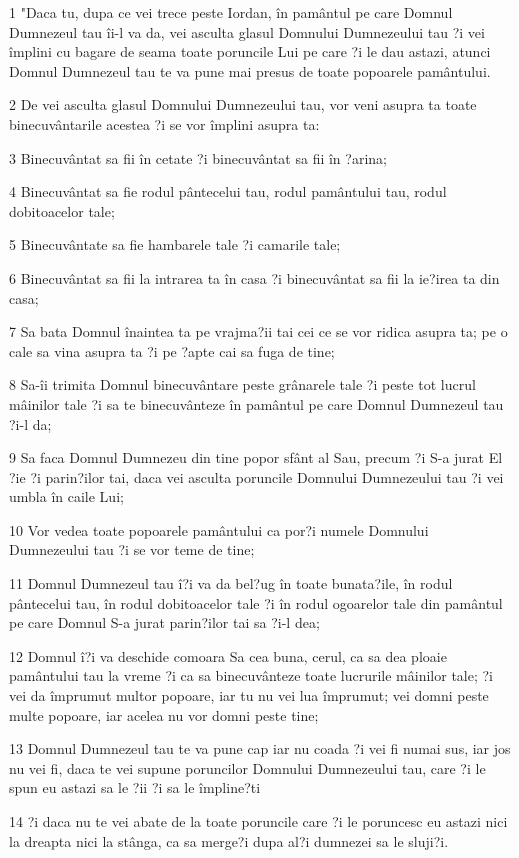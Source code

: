 \par 1 "Daca tu, dupa ce vei trece peste Iordan, în pamântul pe care Domnul Dumnezeul tau îi-l va da, vei asculta glasul Domnului Dumnezeului tau ?i vei împlini cu bagare de seama toate poruncile Lui pe care ?i le dau astazi, atunci Domnul Dumnezeul tau te va pune mai presus de toate popoarele pamântului.
\par 2 De vei asculta glasul Domnului Dumnezeului tau, vor veni asupra ta toate binecuvântarile acestea ?i se vor împlini asupra ta:
\par 3 Binecuvântat sa fii în cetate ?i binecuvântat sa fii în ?arina;
\par 4 Binecuvântat sa fie rodul pântecelui tau, rodul pamântului tau, rodul dobitoacelor tale;
\par 5 Binecuvântate sa fie hambarele tale ?i camarile tale;
\par 6 Binecuvântat sa fii la intrarea ta în casa ?i binecuvântat sa fii la ie?irea ta din casa;
\par 7 Sa bata Domnul înaintea ta pe vrajma?ii tai cei ce se vor ridica asupra ta; pe o cale sa vina asupra ta ?i pe ?apte cai sa fuga de tine;
\par 8 Sa-îi trimita Domnul binecuvântare peste grânarele tale ?i peste tot lucrul mâinilor tale ?i sa te binecuvânteze în pamântul pe care Domnul Dumnezeul tau ?i-l da;
\par 9 Sa faca Domnul Dumnezeu din tine popor sfânt al Sau, precum ?i S-a jurat El ?ie ?i parin?ilor tai, daca vei asculta poruncile Domnului Dumnezeului tau ?i vei umbla în caile Lui;
\par 10 Vor vedea toate popoarele pamântului ca por?i numele Domnului Dumnezeului tau ?i se vor teme de tine;
\par 11 Domnul Dumnezeul tau î?i va da bel?ug în toate bunata?ile, în rodul pântecelui tau, în rodul dobitoacelor tale ?i în rodul ogoarelor tale din pamântul pe care Domnul S-a jurat parin?ilor tai sa ?i-l dea;
\par 12 Domnul î?i va deschide comoara Sa cea buna, cerul, ca sa dea ploaie pamântului tau la vreme ?i ca sa binecuvânteze toate lucrurile mâinilor tale; ?i vei da împrumut multor popoare, iar tu nu vei lua împrumut; vei domni peste multe popoare, iar acelea nu vor domni peste tine;
\par 13 Domnul Dumnezeul tau te va pune cap iar nu coada ?i vei fi numai sus, iar jos nu vei fi, daca te vei supune poruncilor Domnului Dumnezeului tau, care ?i le spun eu astazi sa le ?ii ?i sa le împline?ti
\par 14 ?i daca nu te vei abate de la toate poruncile care ?i le poruncesc eu astazi nici la dreapta nici la stânga, ca sa merge?i dupa al?i dumnezei sa le sluji?i.
